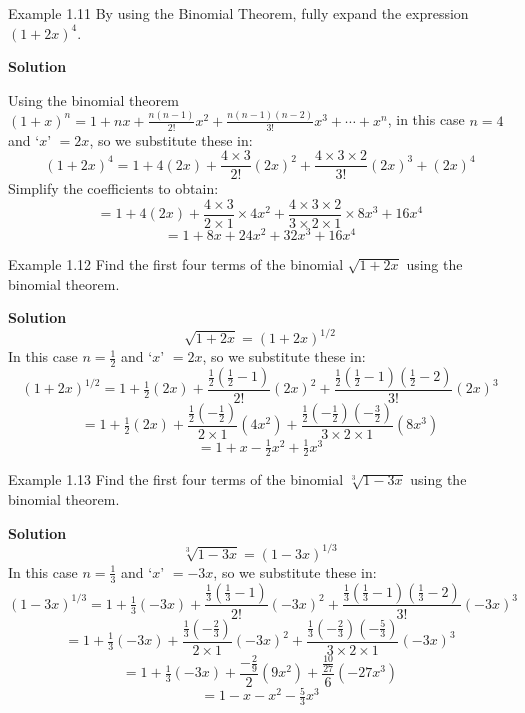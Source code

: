 \begin{example}{Example 1.11}
By using the Binomial Theorem, fully expand the expression $(1+2x)^4$.

\medskip\noindent\textbf{Solution}

Using the binomial theorem $(1+x)^n = 1 + nx + \frac{n(n-1)}{2!}x^2 + \frac{n(n-1)(n-2)}{3!}x^3 + \cdots + x^n$,
in this case $n=4$ and `$x$' $=2x$, so we substitute these in:
\[
  (1+2x)^4 = 1 + 4(2x) + \frac{4\times3}{2!}(2x)^2 + \frac{4\times3\times2}{3!}(2x)^3 + (2x)^4
\]
Simplify the coefficients to obtain:
\[
  = 1 + 4(2x) + \frac{4\times3}{2\times1}\times 4x^2 + \frac{4\times3\times2}{3\times2\times1}\times 8x^3 + 16x^4
\]
\[
  = 1 + 8x + 24x^2 + 32x^3 + 16x^4
\]
\end{example}

\begin{example}{Example 1.12}
Find the first four terms of the binomial $\sqrt{1+2x}$ using the binomial theorem.

\medskip\noindent\textbf{Solution}
\[
  \sqrt{1+2x} = (1+2x)^{1/2}
\]
In this case $n = \tfrac{1}{2}$ and `$x$' $=2x$, so we substitute these in:
\[
  (1+2x)^{1/2} = 1 + \tfrac{1}{2}(2x) + \frac{\tfrac{1}{2}\left(\tfrac{1}{2}-1\right)}{2!}(2x)^2 + \frac{\tfrac{1}{2}\left(\tfrac{1}{2}-1\right)\left(\tfrac{1}{2}-2\right)}{3!}(2x)^3
\]
\[
  = 1 + \tfrac{1}{2}(2x) + \frac{\tfrac{1}{2}\left(-\tfrac{1}{2}\right)}{2\times1}(4x^2) + \frac{\tfrac{1}{2}\left(-\tfrac{1}{2}\right)\left(-\tfrac{3}{2}\right)}{3\times2\times1}(8x^3)
\]
\[
  = 1 + x - \tfrac{1}{2}x^2 + \tfrac{1}{2}x^3
\]
\end{example}

\begin{example}{Example 1.13}
Find the first four terms of the binomial $\sqrt[3]{1-3x}$ using the binomial theorem.

\medskip\noindent\textbf{Solution}
\[
  \sqrt[3]{1-3x} = (1-3x)^{1/3}
\]
In this case $n = \tfrac{1}{3}$ and `$x$' $=-3x$, so we substitute these in:
\[
  (1-3x)^{1/3} = 1 + \tfrac{1}{3}(-3x) + \frac{\tfrac{1}{3}\left(\tfrac{1}{3}-1\right)}{2!}(-3x)^2 + \frac{\tfrac{1}{3}\left(\tfrac{1}{3}-1\right)\left(\tfrac{1}{3}-2\right)}{3!}(-3x)^3
\]
\[
  = 1 + \tfrac{1}{3}(-3x) + \frac{\tfrac{1}{3}\left(-\tfrac{2}{3}\right)}{2\times1}(-3x)^2 + \frac{\tfrac{1}{3}\left(-\tfrac{2}{3}\right)\left(-\tfrac{5}{3}\right)}{3\times2\times1}(-3x)^3
\]
\[
  = 1 + \tfrac{1}{3}(-3x) + \frac{-\tfrac{2}{9}}{2}(9x^2) + \frac{\tfrac{10}{27}}{6}(-27x^3)
\]
\[
  = 1 - x - x^2 - \tfrac{5}{3}x^3
\]
\end{example}

